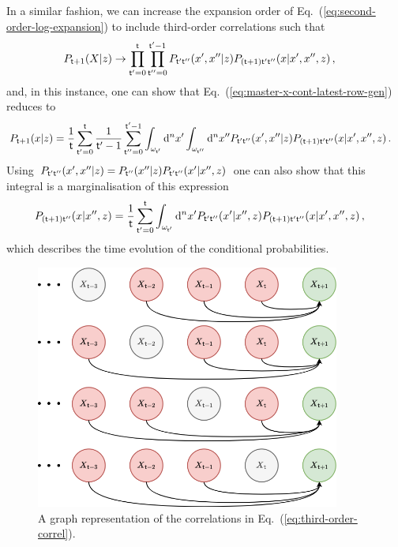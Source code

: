 In a similar fashion, we can increase the expansion order of Eq.~(\ref{eq:second-order-log-expansion}) to include third-order correlations such that 
\begin{align}
P_{{\sf t}+1}(X\vert z) &\rightarrow \prod_{{\sf t}'=0}^{{\sf t}}\prod_{{\sf t}''=0}^{{\sf t}'-1} P_{{\sf t}'{\sf t}''}(x',x''\vert z)P_{({\sf t}+1){\sf t}'{\sf t}''}(x\vert x',x'',z) \,,
\end{align}
and, in this instance, one can show that Eq.~(\ref{eq:master-x-cont-latest-row-gen}) reduces to
\begin{align}
P_{{\sf t}+1}(x\vert z) &= \frac{1}{{\sf t}}\sum_{{\sf t}'=0}^{{\sf t}}\frac{1}{{\sf t}'-1}\sum_{{\sf t}''=0}^{{\sf t}'-1}\int_{\omega_{{\sf t}'}}{\rm d}^nx'\int_{\omega_{{\sf t}''}}{\rm d}^nx'' P_{{\sf t}'{\sf t}''}(x',x''\vert z)P_{({\sf t}+1){\sf t}'{\sf t}''}(x\vert x',x'',z) \label{eq:third-order-correl} \,.
\end{align}
Using $P_{{\sf t}'{\sf t}''}(x',x''\vert z) = P_{{\sf t}''}(x''\vert z) P_{{\sf t}'{\sf t}''}(x'\vert x'', z)$ one can also show that this integral is a marginalisation of this expression
\begin{align}
P_{({\sf t}+1){\sf t}''}(x\vert x'', z) &= \frac{1}{{\sf t}}\sum_{{\sf t}'=0}^{{\sf t}}\int_{\omega_{{\sf t}'}}{\rm d}^nx'P_{{\sf t}'{\sf t}''}(x'\vert x'',z)P_{({\sf t}+1){\sf t}'{\sf t}''}(x\vert x',x'',z) \,,
\end{align}
which describes the time evolution of the conditional probabilities.

\begin{figure}[h]
\centering
\includegraphics[width=10cm]{images/chapter-2-third-temporal-correlation.drawio.png}
\caption{A graph representation of the correlations in Eq.~(\ref{eq:third-order-correl}).}
\label{fig:third-temporal-correlation}
\end{figure}

